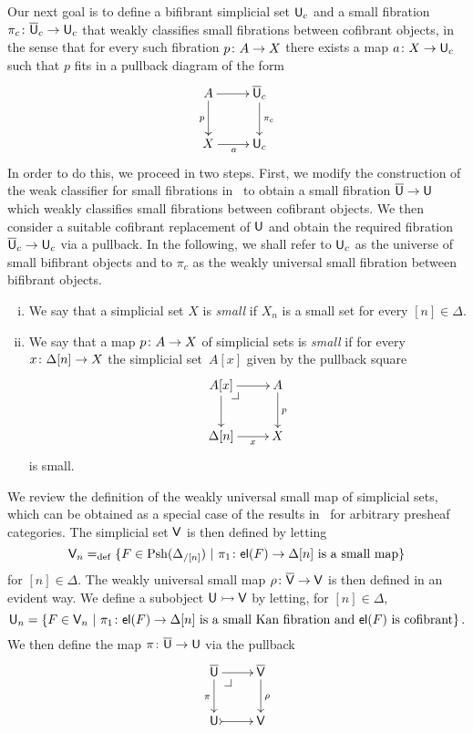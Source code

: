 \documentclass[reqno,10pt,a4paper,oneside,draft]{amsart}
\begin{document}
Our next goal is to define a bifibrant simplicial set $\mathsf{U}_c$ and a small fibration $\pi_c \colon \overline{\mathsf{U}}_c \to \mathsf{U}_c$ that weakly classifies small fibrations between cofibrant objects, in the sense that for every such fibration $p \colon A \to X$ there exists a map $a \colon X \to \mathsf{U}_c$ such that $p$ fits in a pullback diagram of the form
\[
\xymatrix{
A \ar[r] \ar[d]_p   & \UU_c \ar[d]^{\pi_c} \\
X \ar[r]_a &  \U_c }
\]
In order to do this, we proceed in two steps. First, we modify  the construction of the weak classifier for small fibrations in~\cite{voevodsky-simplicial-model} to obtain a small fibration $\overline{\mathsf{U}} \to \mathsf{U}$ which weakly classifies  small fibrations between cofibrant objects. We then consider a suitable cofibrant replacement of $\mathsf{U}$ and obtain the required fibration $\overline{\mathsf{U}}_c \to \mathsf{U}_c$ via a 
pullback. In the following, we shall refer to $\mathsf{U}_c$ as the universe of small bifibrant objects and to $\pi_c$ as the 
weakly universal small fibration between bifibrant objects.

\begin{definition} \hfill 
\label{thm:small}
\begin{enumerate}[(i)]
\item We say that a simplicial set $X$ is \emph{small}  if $X_n$ is a small set for every $[n] \in \Delta$. 
\item We say that a map $p \colon A \to X$ of simplicial sets is \emph{small} if for every $x \colon \Delta[n] 
\to X$ the simplicial set~$A[x]$ given by the pullback square
\[
\xymatrix{
A[x] \ar[r] \ar[d] \drpullback & A \ar[d]^{p} \\
\Delta[n] \ar[r]_-{x} & X }
\]
is small.
\end{enumerate}
\end{definition} 





We review the definition of the weakly universal small map of simplicial sets, which
can be obtained as a special case of the results in~\cite{hofmann-streicher-universes} for arbitrary presheaf
categories. The simplicial set $\mathsf{V}$ is then defined by letting
\[
\mathsf{V}_n =_{\operatorname{def}} \{ F \in \mathrm{Psh}(\Delta_{/[n]}) \ | \ \pi_1 \colon \mathsf{el}(F) \to \Delta[n] \text{ is a small
map} \}
\]
for $[n] \in \Delta$. The weakly universal small map $\rho \colon \overline{\mathsf{V}} \to \mathsf{V}$ is then defined in an evident way. 
We define a subobject $\mathsf{U} \rightarrowtail \mathsf{V}$ by letting, for $[n] \in \Delta$, 
\[
\mathsf{U}_n = \{ F \in \mathsf{V}_n \ | \ \pi_1 \colon \mathsf{el}(F) \to \Delta[n] \text{ is a small Kan fibration and $\mathsf{el}(F)$ is cofibrant} \} \, .
\]
We then define the map $\pi \colon \overline{\mathsf{U}} \to \mathsf{U}$ via the pullback 
\[
\xymatrix{
\UU \ar[r] \ar[d]_\pi \drpullback  & \VV \ar[d]^\rho \\
\U \ar@{>->}[r] & \V }
\]
\end{document}
